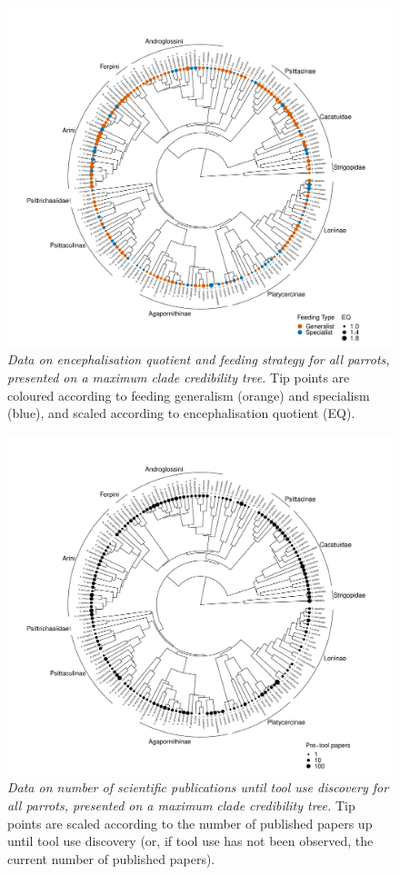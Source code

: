 \documentclass[
  man,floatsintext]{apa6}
\begin{document}
\begin{figure}
\centering
\includegraphics{manuscript_files/figure-latex/plotPhylo2-1.pdf}
\caption{\label{fig:plotPhylo2}\emph{Data on encephalisation quotient and feeding strategy for all parrots, presented on a maximum clade credibility tree.} Tip points are coloured according to feeding generalism (orange) and specialism (blue), and scaled according to encephalisation quotient (EQ).}
\end{figure}

\newpage



\begin{figure}
\centering
\includegraphics{manuscript_files/figure-latex/plotPhylo3-1.pdf}
\caption{\label{fig:plotPhylo3}\emph{Data on number of scientific publications until tool use discovery for all parrots, presented on a maximum clade credibility tree.} Tip points are scaled according to the number of published papers up until tool use discovery (or, if tool use has not been observed, the current number of published papers).}
\end{figure}
\end{document}
